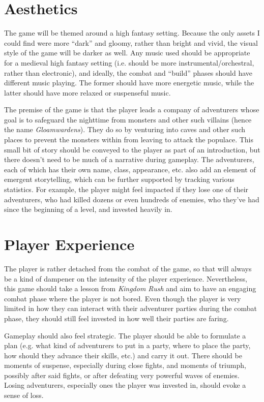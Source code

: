 \documentclass[10pt]{article}
\begin{document}
\section{Aesthetics}

The game will be themed around a high fantasy setting. Because the only assets I could find were more ``dark'' and gloomy, rather than bright
and vivid, the visual style of the game will be darker as well. Any music used should be appropriate for a medieval high fantasy setting
(i.e. should be more instrumental/orchestral, rather than electronic), and ideally, the combat and ``build'' phases should have different music playing.
The former should have more energetic music, while the latter should have more relaxed or suspenseful music.

The premise of the game is that the player leads a company of adventurers whose goal is to safeguard the nighttime from monsters and other such villains
(hence the name \textit{Gloamwardens}). They do so by venturing into caves and other such places to prevent the monsters within from leaving
to attack the populace. This small bit of story should be conveyed to the player as part of an introduction, but there doesn't need to be
much of a narrative during gameplay. The adventurers, each of which has their own name, class, appearance, etc. also add an element of emergent
storytelling, which can be further supported by tracking various statistics. For example, the player might feel impacted if they lose one
of their adventurers, who had killed dozens or even hundreds of enemies, who they've had since the beginning of a level, and invested heavily in.

\section{Player Experience}

The player is rather detached from the combat of the game, so that will always be a kind of dampener on the intensity of the player experience.
Nevertheless, this game should take a lesson from \textit{Kingdom Rush} and aim to have an engaging combat phase where the player is not bored.
Even though the player is very limited in how they can interact with their adventurer parties during the combat phase, they should still feel invested
in how well their parties are faring.

Gameplay should also feel strategic. The player should be able to formulate a plan (e.g. what kind of adventurers to put in a party, where to place the party,
how should they advance their skills, etc.) and carry it out. There should be moments of suspense, especially during close fights, and moments of triumph,
possibly after said fights, or after defeating very powerful waves of enemies. Losing adventurers, especially ones the player was invested in,
should evoke a sense of loss.
\end{document}

